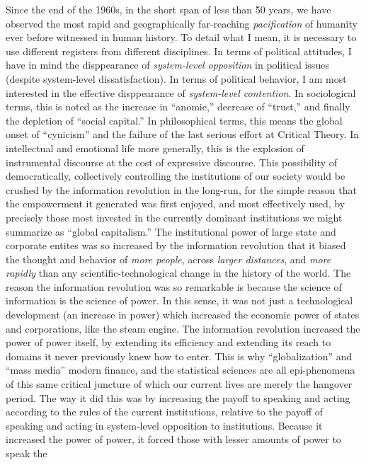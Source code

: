 \documentclass[12pt,book]{article}
\begin{document}
Since the end of the 1960s, in the short span of less than 50 years, we
have observed the most rapid and geographically far-reaching
\emph{pacification} of humanity ever before witnessed in human history.
To detail what I mean, it is necessary to use different registers from
different disciplines. In terms of political attitudes, I have in mind
the disppearance of \emph{system-level opposition} in political issues
(despite system-level dissatisfaction). In terms of political behavior,
I am most interested in the effective disppearance of \emph{system-level
contention}. In sociological terms, this is noted as the increase in
``anomie,'' decrease of ``trust,'' and finally the depletion of ``social
capital.'' In philosophical terms, this means the global onset of
``cynicism'' and the failure of the last serious effort at Critical
Theory. In intellectual and emotional life more generally, this is the
explosion of instrumental discourse at the cost of expressive discourse.
This possibility of democratically, collectively controlling the
institutions of our society would be crushed by the information
revolution in the long-run, for the simple reason that the empowerment
it generated was first enjoyed, and most effectively used, by precisely
those most invested in the currently dominant institutions we might
summarize as ``global capitalism.'' The institutional power of large
state and corporate entites was so increased by the information
revolution that it biased the thought and behavior of \emph{more
people}, across \emph{larger distances}, and \emph{more rapidly} than
any scientific-technological change in the history of the world. The
reason the information revolution was so remarkable is because the
science of information is the science of power. In this sense, it was
not just a technological development (an increase in power) which
increased the economic power of states and corporations, like the steam
engine. The information revolution increased the power of power itself,
by extending its efficiency and extending its reach to domains it never
previously knew how to enter. This is why ``globalization'' and ``mass
media'' modern finance, and the statistical sciences are all
epi-phenomena of this same critical juncture of which our current lives
are merely the hangover period. The way it did this was by increasing
the payoff to speaking and acting according to the rules of the current
institutions, relative to the payoff of speaking and acting in
system-level opposition to institutions. Because it increased the power
of power, it forced those with lesser amounts of power to speak the
\end{document}
